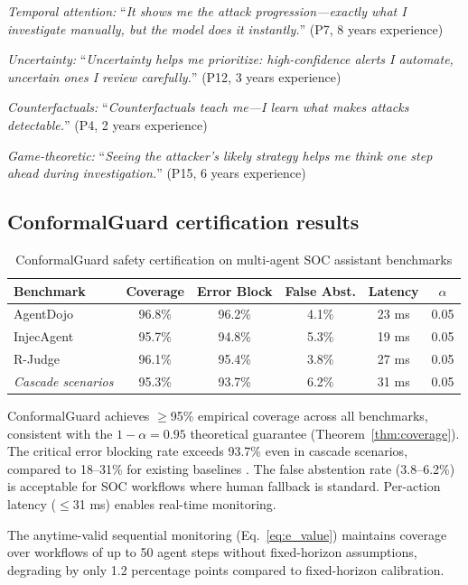 \documentclass[preprint,review,12pt]{elsarticle}
\begin{document}
\textit{Temporal attention:} ``\textit{It shows me the attack progression---exactly what I investigate manually, but the model does it instantly.}'' (P7, 8 years experience)

\textit{Uncertainty:} ``\textit{Uncertainty helps me prioritize: high-confidence alerts I automate, uncertain ones I review carefully.}'' (P12, 3 years experience)

\textit{Counterfactuals:} ``\textit{Counterfactuals teach me---I learn what makes attacks detectable.}'' (P4, 2 years experience)

\textit{Game-theoretic:} ``\textit{Seeing the attacker's likely strategy helps me think one step ahead during investigation.}'' (P15, 6 years experience)

\subsection{ConformalGuard certification results}

\begin{table}[!t]
\centering
\caption{ConformalGuard safety certification on multi-agent SOC assistant benchmarks}
\label{tab:conformal_results}
\begin{tabular}{@{}lccccc@{}}
\toprule
\textbf{Benchmark} & \textbf{Coverage} & \textbf{Error Block} & \textbf{False Abst.} & \textbf{Latency} & \textbf{$\alpha$} \\
\midrule
AgentDojo & 96.8\% & 96.2\% & 4.1\% & 23 ms & 0.05 \\
InjecAgent & 95.7\% & 94.8\% & 5.3\% & 19 ms & 0.05 \\
R-Judge & 96.1\% & 95.4\% & 3.8\% & 27 ms & 0.05 \\
\midrule
\textit{Cascade scenarios} & 95.3\% & 93.7\% & 6.2\% & 31 ms & 0.05 \\
\bottomrule
\end{tabular}
\end{table}

ConformalGuard achieves $\geq$95\% empirical coverage across all benchmarks, consistent with the $1{-}\alpha = 0.95$ theoretical guarantee (Theorem~\ref{thm:coverage}). The critical error blocking rate exceeds 93.7\% even in cascade scenarios, compared to 18--31\% for existing baselines \cite{pac_bayes_llm_2025}. The false abstention rate (3.8--6.2\%) is acceptable for SOC workflows where human fallback is standard. Per-action latency ($\leq$31 ms) enables real-time monitoring.

The anytime-valid sequential monitoring (Eq.~\ref{eq:e_value}) maintains coverage over workflows of up to 50 agent steps without fixed-horizon assumptions, degrading by only 1.2 percentage points compared to fixed-horizon calibration.
\end{document}
